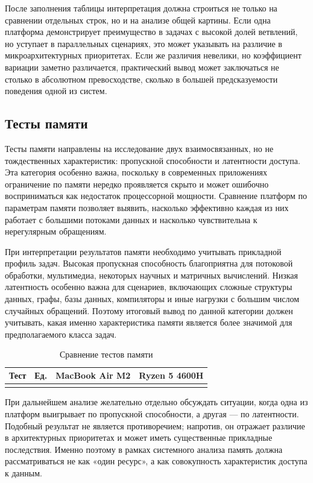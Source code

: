 \noindent После заполнения таблицы интерпретация должна строиться не только на сравнении отдельных строк, но и на анализе общей картины. Если одна платформа демонстрирует преимущество в задачах с высокой долей ветвлений, но уступает в параллельных сценариях, это может указывать на различие в микроархитектурных приоритетах. Если же различия невелики, но коэффициент вариации заметно различается, практический вывод может заключаться не столько в абсолютном превосходстве, сколько в большей предсказуемости поведения одной из систем.

\subsection{Тесты памяти}

Тесты памяти направлены на исследование двух взаимосвязанных, но не тождественных характеристик: пропускной способности и латентности доступа. Эта категория особенно важна, поскольку в современных приложениях ограничение по памяти нередко проявляется скрыто и может ошибочно восприниматься как недостаток процессорной мощности. Сравнение платформ по параметрам памяти позволяет выявить, насколько эффективно каждая из них работает с большими потоками данных и насколько чувствительна к нерегулярным обращениям.

При интерпретации результатов памяти необходимо учитывать прикладной профиль задач. Высокая пропускная способность благоприятна для потоковой обработки, мультимедиа, некоторых научных и матричных вычислений. Низкая латентность особенно важна для сценариев, включающих сложные структуры данных, графы, базы данных, компиляторы и иные нагрузки с большим числом случайных обращений. Поэтому итоговый вывод по данной категории должен учитывать, какая именно характеристика памяти является более значимой для предполагаемого класса задач.

\begin{table}[!htbp]
\centering
\caption{Сравнение тестов памяти}
\label{tab:mem_compare}
\begin{tabular}{|l|c|c|c|}
\hline
\textbf{Тест} & \textbf{Ед.} & \textbf{MacBook Air M2} & \textbf{Ryzen 5 4600H} \\
\hline
 &  &  &  \\
\hline
\end{tabular}
\end{table}

\noindent При дальнейшем анализе желательно отдельно обсуждать ситуации, когда одна из платформ выигрывает по пропускной способности, а другая --- по латентности. Подобный результат не является противоречием; напротив, он отражает различие в архитектурных приоритетах и может иметь существенные прикладные последствия. Именно поэтому в рамках системного анализа память должна рассматриваться не как «один ресурс», а как совокупность характеристик доступа к данным.

